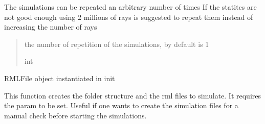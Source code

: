 \documentclass[letterpaper,10pt,english]{sphinxmanual}
\begin{document}
\begin{fulllineitems}
\begin{fulllineitems}
\end{fulllineitems}


\begin{fulllineitems}
\label{\detokenize{index:raypyng.simulate.Simulate.repeat}}
\pysigstartsignatures
{}
\pysigstopsignatures
\sphinxAtStartPar
The simulations can be repeated an arbitrary number of times
If the statitcs are not good enough using 2 millions of rays is suggested
to repeat them instead of increasing the number of rays
\begin{quote}\begin{description}
\sphinxAtStartPar
the number of repetition of the simulations, by default is 1

\sphinxAtStartPar
int

\end{description}\end{quote}

\end{fulllineitems}


\begin{fulllineitems}
\label{\detokenize{index:raypyng.simulate.Simulate.rml}}
\pysigstartsignatures
{}
\pysigstopsignatures
\sphinxAtStartPar
RMLFile object instantiated in init

\end{fulllineitems}


\begin{fulllineitems}
\label{\detokenize{index:raypyng.simulate.Simulate.rml_list}}
\pysigstartsignatures
{}
\pysigstopsignatures
\sphinxAtStartPar
This function creates the folder structure and the rml files to simulate.
It requires the param to be set. Useful if one wants to create the simulation files
for a manual check before starting the simulations.


\end{fulllineitems}
\end{fulllineitems}
\end{document}
